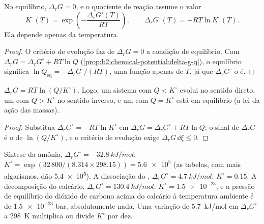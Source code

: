 \begin{theorem}\label{thm:b2:equilibrium-shifts:k-from-g}
No equilíbrio, $\Delta_r G = 0$, e o quociente de reação assume o valor
\[
  K^\circ(T) = \exp\!\left(-\frac{\Delta_r G^\circ(T)}{RT}\right), \qquad
  \Delta_r G^\circ(T) = -RT\ln K^\circ(T) .
\]
Ela depende apenas da temperatura.
\end{theorem}

\begin{proof}
O critério de evolução faz de $\Delta_r G = 0$ a condição de equilíbrio.
Com $\Delta_r G = \Delta_r G^\circ + RT\ln Q$
(\cref{prop:b2:chemical-potential:delta-g-q}), o equilíbrio significa $\ln Q_{\text{eq}}
= -\Delta_r G^\circ/(RT)$, uma função apenas de $T$, já que $\Delta_r G^\circ$ o é.
\end{proof}

\begin{corollary}\label{cor:b2:equilibrium-shifts:mass-action}
$\Delta_r G = RT\ln(Q/K^\circ)$. Logo, um sistema com $Q < K^\circ$ evolui
no sentido direto, um com $Q > K^\circ$ no sentido inverso, e um com $Q = K^\circ$
está em equilíbrio (a lei da ação das massas).
\end{corollary}

\begin{proof}
Substitua $\Delta_r G^\circ = -RT\ln K^\circ$ em $\Delta_r G = \Delta_r G^\circ
+ RT\ln Q$; o sinal de $\Delta_r G$ é o de $\ln(Q/K^\circ)$, e o
critério de evolução exige $\Delta_r G\,\dd\xi \leq 0$.
\end{proof}

\begin{example}\label{ex:b2:equilibrium-shifts:constants}
Síntese da amônia, $\Delta_r G^\circ = \qty{-32.8}{kJ/mol}$: $K^\circ =
\exp(32\,800/(8.314 \times 298.15)) = \num{5.6e5}$ (as tabelas, com mais
algarismos, dão \num{5.4e5}). A dissociação do , $\Delta_r G^\circ =
\qty{+4.7}{kJ/mol}$: $K^\circ = 0.15$. A decomposição do calcário,
$\Delta_r G^\circ = \qty{+130.4}{kJ/mol}$: $K^\circ = \num{1.5e-23}$, e a
pressão de equilíbrio do dióxido de carbono acima do calcário à temperatura
ambiente é de $\num{1.5e-23}$ bar, absolutamente nada. Uma variação de
\qty{5.7}{kJ/mol} em $\Delta_r G^\circ$ a \qty{298}{K} multiplica ou divide
$K^\circ$ por dez.
\end{example}


